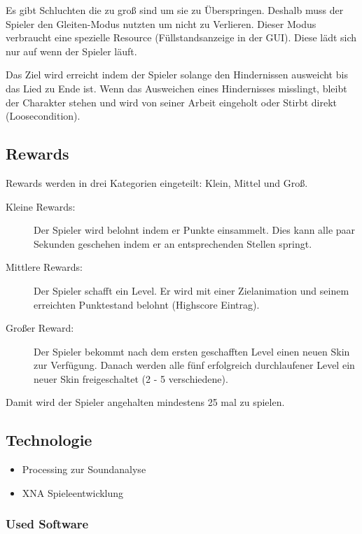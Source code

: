 \documentclass[Skript.tex]{subfiles}
\begin{document}
Es gibt Schluchten die zu groß sind um sie zu Überspringen. 
Deshalb muss der Spieler den Gleiten-Modus nutzten um nicht zu Verlieren. 
Dieser Modus verbraucht eine spezielle Resource (Füllstandsanzeige in der GUI).
Diese lädt sich nur auf wenn der Spieler läuft.

Das Ziel wird erreicht indem der Spieler solange den Hindernissen ausweicht bis das Lied zu Ende ist.
Wenn das Ausweichen eines Hindernisses misslingt, bleibt der Charakter stehen und wird von seiner Arbeit eingeholt oder Stirbt direkt (Loosecondition).  


\subsection{Rewards}

Rewards werden in drei Kategorien eingeteilt: Klein, Mittel und Groß.

\begin{description}
\item[Kleine Rewards: ] Der Spieler wird belohnt indem er Punkte einsammelt. 
Dies kann alle paar Sekunden geschehen indem er an entsprechenden Stellen springt.

\item[Mittlere Rewards: ] Der Spieler schafft ein Level.
Er wird mit einer Zielanimation und seinem erreichten  Punktestand belohnt (Highscore Eintrag).

\item[Großer Reward: ] Der Spieler bekommt nach dem ersten geschafften Level einen neuen Skin zur Verfügung.
Danach werden alle fünf erfolgreich durchlaufener Level ein neuer Skin freigeschaltet (2 - 5 verschiedene).
\end{description}

Damit wird der Spieler angehalten mindestens 25 mal zu spielen.


\subsection{Technologie}

\begin{itemize}
\item Processing zur Soundanalyse
\item XNA Spieleentwicklung
\end{itemize}

\subsubsection{Used Software}
\end{document}
